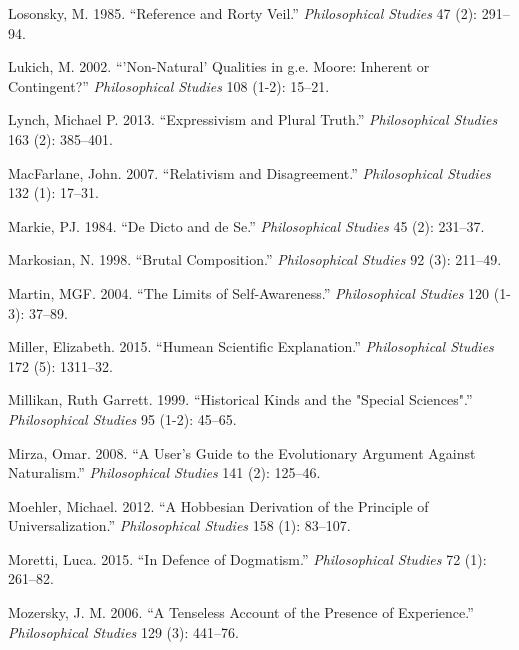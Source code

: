 \documentclass[
  10pt,
  letterpaper,
  DIV=11,
  numbers=noendperiod,
  twoside]{scrartcl}
\newlength{\cslhangindent}
\newenvironment{CSLReferences}[2] %
 {\begin{list}{}{%
  \setlength{\itemindent}{0pt}
  \setlength{\leftmargin}{0pt}
  \setlength{\parsep}{0pt}
  \ifodd #1
   \setlength{\leftmargin}{\cslhangindent}
   \setlength{\itemindent}{-1\cslhangindent}
  \fi
  \setlength{\itemsep}{#2\baselineskip}}}
 {\end{list}}
\begin{document}
\begin{CSLReferences}{1}{0}
Losonsky, M. 1985. {``Reference and Rorty Veil.''} \emph{Philosophical
Studies} 47 (2): 291--94.

Lukich, M. 2002. {``'Non-Natural' Qualities in g.e. Moore: Inherent or
Contingent?''} \emph{Philosophical Studies} 108 (1-2): 15--21.

Lynch, Michael P. 2013. {``Expressivism and Plural Truth.''}
\emph{Philosophical Studies} 163 (2): 385--401.

MacFarlane, John. 2007. {``Relativism and Disagreement.''}
\emph{Philosophical Studies} 132 (1): 17--31.

Markie, PJ. 1984. {``De Dicto and de Se.''} \emph{Philosophical Studies}
45 (2): 231--37.

Markosian, N. 1998. {``Brutal Composition.''} \emph{Philosophical
Studies} 92 (3): 211--49.

Martin, MGF. 2004. {``The Limits of Self-Awareness.''}
\emph{Philosophical Studies} 120 (1-3): 37--89.

Miller, Elizabeth. 2015. {``Humean Scientific Explanation.''}
\emph{Philosophical Studies} 172 (5): 1311--32.

Millikan, Ruth Garrett. 1999. {``Historical Kinds and the "Special
Sciences".''} \emph{Philosophical Studies} 95 (1-2): 45--65.

Mirza, Omar. 2008. {``A User's Guide to the Evolutionary Argument
Against Naturalism.''} \emph{Philosophical Studies} 141 (2): 125--46.

Moehler, Michael. 2012. {``A Hobbesian Derivation of the Principle of
Universalization.''} \emph{Philosophical Studies} 158 (1): 83--107.

Moretti, Luca. 2015. {``In Defence of Dogmatism.''} \emph{Philosophical
Studies} 72 (1): 261--82.

Mozersky, J. M. 2006. {``A Tenseless Account of the Presence of
Experience.''} \emph{Philosophical Studies} 129 (3): 441--76.


\end{CSLReferences}
\end{document}
